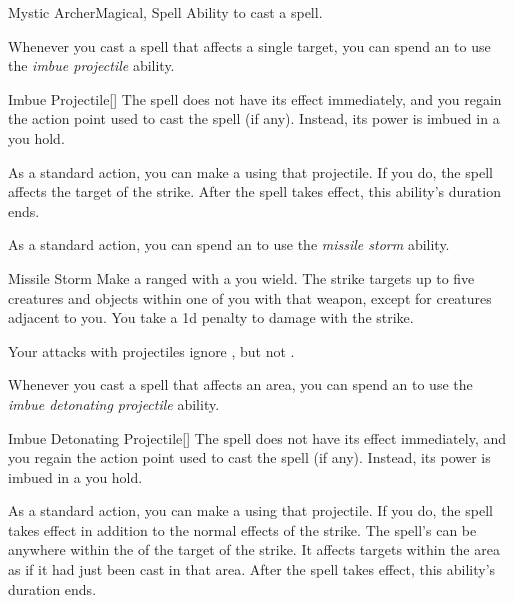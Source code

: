     \begin{feat}{Mystic Archer}{Magical, Spell}
        \featpre Ability to cast a spell.

         Whenever you cast a spell that affects a single target, you can spend an  to use the \textit{imbue projectile} ability.
        \begin{ability}{Imbue Projectile}[]
            The spell does not have its effect immediately, and you regain the action point used to cast the spell (if any).
            Instead, its power is imbued in a  you hold. 

            As a standard action, you can make a  using that projectile.
            If you do, the spell affects the target of the strike.
            After the spell takes effect, this ability's duration ends.
        \end{ability}

         As a standard action, you can spend an  to use the \textit{missile storm} ability.
        \begin{ability}{Missile Storm}
            Make a ranged  with a  you wield.
            The strike targets up to five creatures and objects within one  of you with that weapon, except for creatures adjacent to you.
            You take a \minus1d penalty to damage with the strike.
        \end{ability}

         Your attacks with projectiles ignore , but not .

         Whenever you cast a spell that affects an area, you can spend an  to use the \textit{imbue detonating projectile} ability.
        \begin{ability}{Imbue Detonating Projectile}[]
            The spell does not have its effect immediately, and you regain the action point used to cast the spell (if any).
            Instead, its power is imbued in a  you hold. 

            As a standard action, you can make a  using that projectile.
            If you do, the spell takes effect in addition to the normal effects of the strike.
            The spell's  can be anywhere within the  of the target of the strike.
            It affects targets within the area as if it had just been cast in that area.
            After the spell takes effect, this ability's duration ends.
        \end{ability}


\end{feat}
